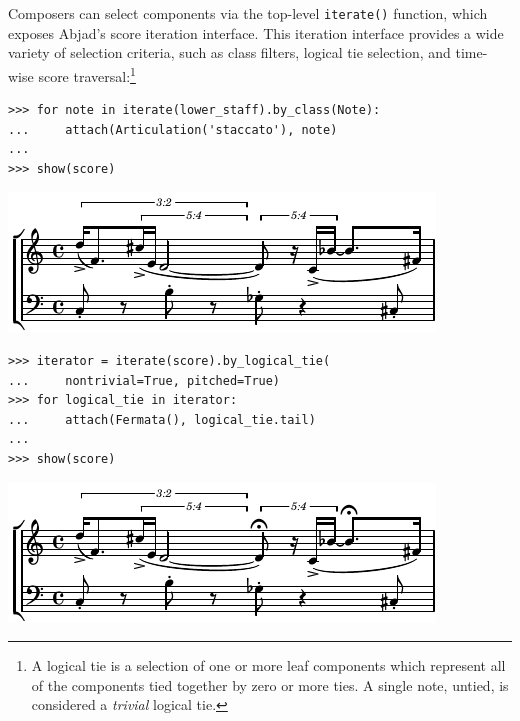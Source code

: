 \documentclass{article}
\begin{document}
Composers can select components via the top-level \texttt{iterate()} function,
which exposes Abjad's score iteration interface. This iteration interface
provides a wide variety of selection criteria, such as class filters, logical
tie selection, and time-wise score traversal:\footnote{A logical tie is a
selection of one or more leaf components which represent all of the components
tied together by zero or more ties. A single note, untied, is considered a
\emph{trivial} logical tie.}

\begin{lstlisting}
>>> for note in iterate(lower_staff).by_class(Note):
...     attach(Articulation('staccato'), note)
...
>>> show(score)
\end{lstlisting}
\includegraphics{assets/lilypond-b7a01ad584c3c470c0bbff20fbc76741.pdf}

\begin{lstlisting}
>>> iterator = iterate(score).by_logical_tie(
...     nontrivial=True, pitched=True)
>>> for logical_tie in iterator:
...     attach(Fermata(), logical_tie.tail)
...
>>> show(score)
\end{lstlisting}
\includegraphics{assets/lilypond-b5f9325282fd0c528bd1874a4b8a6987.pdf}
\end{document}
